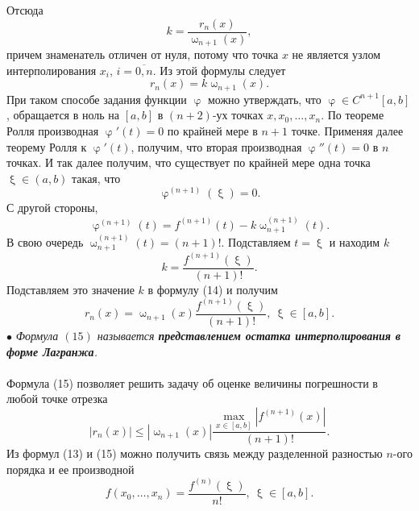 \documentclass[a4paper, 12pt]{report}
\numberwithin{equation}{section}
\renewcommand{\leq}{\leqslant}
\renewcommand{\varphi}{\upvarphi}
\renewcommand{\omega}{\upomega}
\renewcommand{\xi}{\upxi}
\begin{document}
	Отсюда $$k = \dfrac{r_n(x)}{\omega_{n+1}(x)},$$
	причем знаменатель отличен от нуля, потому что точка $x$ не является узлом интерполирования $x_i$, $i=\overline{0,n}$.
	Из этой формулы следует 
	\begin{equation}
		r_{n}(x) = k\omega_{n+1}(x).
	\end{equation}
	При таком способе задания функции $\varphi$ можно утверждать, что $\varphi \in C^{n+1}[a,b]$, обращается в ноль на $[a,b]$ в $(n+2)$-ух точках $x,x_0,\ldots, x_n$. По теореме Ролля производная $\varphi'(t) = 0$ по крайней мере в $n+1$ точке. Применяя далее теорему Ролля к $\varphi'(t)$, получим, что вторая производная $\varphi''(t) = 0$ в $n$ точках. И так далее получим, что существует по крайней мере одна точка $\xi\in (a,b)$ такая, что $$\varphi^{(n+1)}(\xi) = 0.$$
	С другой стороны, $$\varphi^{(n+1)}(t) = f^{(n+1)}(t) - k\omega_{n+1}^{(n+1)}(t).$$
	В свою очередь $\omega^{(n+1)}_{n+1}(t) = (n+1)!$. Подставляем $t=\xi$ и находим $k$ $$k=\dfrac{f^{(n+1)}(\xi)}{(n+1)!}.$$
	Подставляем это значение $k$ в формулу (14) и получим \begin{equation}
		r_n(x) = \omega_{n+1}(x) \dfrac{f^{(n+1)}(\xi)}{(n+1)!},\ \xi \in [a,b].
	\end{equation}
	$\bullet$ \textit{Формула $(15)$ называется \textbf{представлением остатка интерполирования в форме Лагранжа}.}\\\\
	Формула (15) позволяет решить задачу об оценке величины погрешности в любой точке отрезка 
	$$|r_n(x)| \leq |\omega_{n+1}(x)| \dfrac{\underset{x\in[a,b]}{\max} |f^{(n+1)}(x)|}{(n+1)!}.$$
	Из формул (13) и (15) можно получить связь между разделенной разностью $n$-ого порядка и ее производной \begin{equation}
		f(x_0,\ldots, x_n) = \dfrac{f^{(n)}(\xi)}{n!},\ \xi\in[a,b].
	\end{equation}
\end{document}
